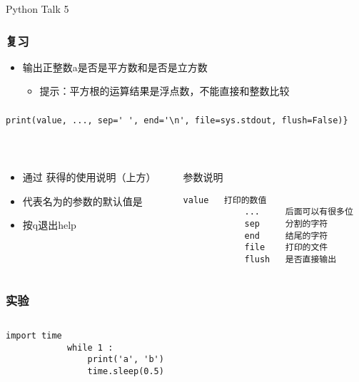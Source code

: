 


\begin{CJK}{UTF8}{gbsn}

\PreFirstFrame
\begin{frame} [fragile]
	\centerline{\fontsize{42}{42}\selectfont Python Talk 5}
\end{frame}
\PostFirstFrame

\begin{frame} [fragile]
	\frametitle{复习}
	\linespread{1.5}
	\begin{itemize}
	\item 输出正整数a是否是平方数和是否是立方数
		\begin{itemize}
		\item 提示：平方根的运算结果是浮点数，不能直接和整数比较
		\end{itemize}
	\end{itemize}
\end{frame}

\begin{frame} [fragile]
	\frametitle{}
	\linespread{1.25}
	\begin{lstlisting}[style=pythonstyle, gobble=4]
	print(value, ..., sep=' ', end='\n', file=sys.stdout, flush=False)}
	\end{lstlisting}
	\
	\begin{columns}[T]
		\begin{column}[T]{.5\textwidth}
			\begin{itemize}
			\item 通过
				获得的使用说明（上方）
			\item {}
				代表名为的参数的默认值是
			\item 按q退出help
			\end{itemize}
		\end{column}
		\begin{column}[T]{.5\textwidth}
			参数说明
			\begin{lstlisting}[style=pythonstyle, gobble=12]
			value	打印的数值
			...		后面可以有很多位
			sep		分割的字符
			end		结尾的字符
			file 	打印的文件
			flush	是否直接输出
			\end{lstlisting}
		\end{column}
	\end{columns}
\end{frame}

\begin{frame} [fragile]
	\frametitle{\inlinePython{print}实验}
	\begin{columns}[T]
		\begin{column}[T]{.5\textwidth}
			\begin{lstlisting}[style=pythonstyle, gobble=12]
			import time
			while 1 :
				print('a', 'b')
				time.sleep(0.5)


\end{lstlisting}
\end{column}
\end{columns}
\end{frame}
\end{CJK}
